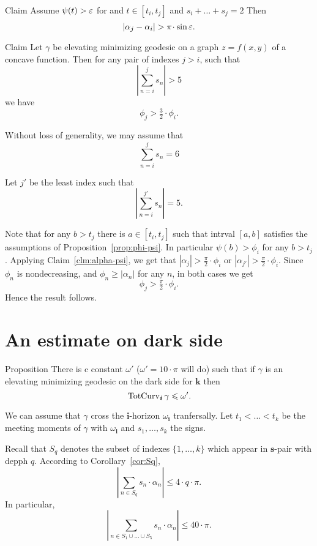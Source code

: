 \documentclass[a4paper,10pt]{amsart}
\begin{document}
\begin{thm}{Claim}\label{clm:alpha-psi}
Assume $\psi(t)>\varepsilon$ for and $t\in[t_{i},t_{j}]$
and $s_i+\dots+s_j=2$
Then 
\[|\alpha_j-\alpha_i|>\pi\cdot\sin\eps.\] 
\end{thm}


\begin{thm}{Claim}\label{clm:geometric-grouth}
Let $\gamma$
be elevating minimizing geodesic on a graph $z=f(x,y)$ of a concave function.
Then for any pair of indexes $j>i$,
such that 
\[|\sum_{n=i}^{j}s_n|> 5\]
we have
\[\phi_j>\tfrac32\cdot\phi_i.\]
\end{thm}


Without loss of generality, we may assume that 
\[\sum_{n=i}^{j}s_n= 6\]

Let $j'$ be the least index 
such that
\[|\sum_{n=i}^{j'} s_n|=5.\]

Note that for any $b>t_j$ there is $a\in[t_i,t_j]$
such that intrval $[a,b]$ satisfies the assumptions of Proposition~\ref{prop:phi-psi}.
In particular $\psi(b)>\phi_i$ for any $b>t_j$.
Applying Claim~\ref{clm:alpha-psi},
we get that $|\alpha_j|>\tfrac\pi2\cdot \phi_i$ or 
$|\alpha_{j'}|>\tfrac\pi2\cdot \phi_i$.
Since $\phi_n$ is nondecreasing,
and $\phi_n\ge |\alpha_n|$ for any $n$,
in both cases we get
\[\phi_j>\tfrac\pi2\cdot \phi_i.\]
Hence the result follows.
\qeds


\section{An estimate on dark side}\label{sec:graph}

\begin{thm}{Proposition}\label{prop:graph}
There is c constant $\omega'$ ($\omega'=10\cdot\pi$ will do)
such that
if $\gamma$ is an elevating minimizing geodesic on the dark side for $\bm{k}$ then
\[\mathop{\rm TotCurv}\nolimits_{\bm{i}}\gamma\leqslant \omega'.\]
\end{thm}

We can assume that
$\gamma$ cross the $\bm{i}$-horizon $\omega_{\bm{i}}$ tranfersally.
Let $t_1<\dots<t_k$ be the meeting moments of $\gamma$ with $\omega_{\bm{i}}$ and
$s_1,\dots,s_k$ the signs.

Recall that $S_q$ denotes the subset of indexes $\{1,\dots,k\}$
which appear in $\bm{s}$-pair with depph $q$.
According to Corollary~\ref{cor:Sq},
\[\left|\sum_{n\in S_q}s_n\cdot\alpha_n\right|\le 4\cdot q\cdot \pi.\]
In particular,
\[\left|\sum_{n\in S_1\cup\dots\cup S_5}
s_n\cdot\alpha_n\right|
\le 
40\cdot\pi.\]
\end{document}
